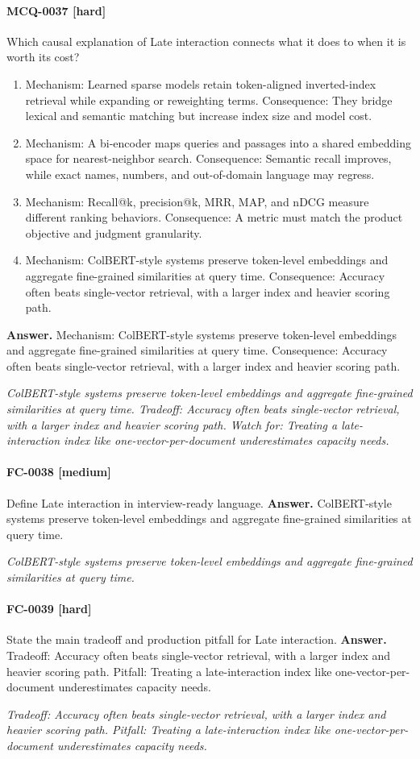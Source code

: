 \paragraph{MCQ-0037 [hard]} Which causal explanation of Late interaction connects what it does to when it is worth its cost?
\begin{enumerate}[label=\Alph*.]
\item Mechanism: Learned sparse models retain token-aligned inverted-index retrieval while expanding or reweighting terms. Consequence: They bridge lexical and semantic matching but increase index size and model cost.
\item Mechanism: A bi-encoder maps queries and passages into a shared embedding space for nearest-neighbor search. Consequence: Semantic recall improves, while exact names, numbers, and out-of-domain language may regress.
\item Mechanism: Recall@k, precision@k, MRR, MAP, and nDCG measure different ranking behaviors. Consequence: A metric must match the product objective and judgment granularity.
\item Mechanism: ColBERT-style systems preserve token-level embeddings and aggregate fine-grained similarities at query time. Consequence: Accuracy often beats single-vector retrieval, with a larger index and heavier scoring path.
\end{enumerate}
\noindent\textbf{Answer.} Mechanism: ColBERT-style systems preserve token-level embeddings and aggregate fine-grained similarities at query time. Consequence: Accuracy often beats single-vector retrieval, with a larger index and heavier scoring path.
\par\textit{ColBERT-style systems preserve token-level embeddings and aggregate fine-grained similarities at query time. Tradeoff: Accuracy often beats single-vector retrieval, with a larger index and heavier scoring path. Watch for: Treating a late-interaction index like one-vector-per-document underestimates capacity needs.}
\paragraph{FC-0038 [medium]} Define Late interaction in interview-ready language.
\noindent\textbf{Answer.} ColBERT-style systems preserve token-level embeddings and aggregate fine-grained similarities at query time.
\par\textit{ColBERT-style systems preserve token-level embeddings and aggregate fine-grained similarities at query time.}
\paragraph{FC-0039 [hard]} State the main tradeoff and production pitfall for Late interaction.
\noindent\textbf{Answer.} Tradeoff: Accuracy often beats single-vector retrieval, with a larger index and heavier scoring path. Pitfall: Treating a late-interaction index like one-vector-per-document underestimates capacity needs.
\par\textit{Tradeoff: Accuracy often beats single-vector retrieval, with a larger index and heavier scoring path. Pitfall: Treating a late-interaction index like one-vector-per-document underestimates capacity needs.}
